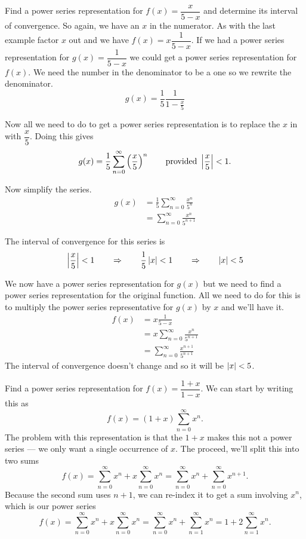 \begin{example}\label{ex_power_five}%
Find a power series representation for $f(x)=\dfrac x{5-x}$ and determine its interval of convergence.
\solution
So again, we have an $x$ in the numerator. As with the last example factor $x$ out and we have $f(x)=x\dfrac1{5-x}$. If we had a power series representation for $g(x)=\dfrac1{5-x}$ we could get a power series representation for $f(x)$. We need the number in the denominator to be a one so we rewrite the denominator.  
\[g(x)=\frac15\frac1{1-\frac x5}\]

Now all we need to do to get a power series representation is to replace the $x$ in  with $\dfrac x5$.  Doing this gives
\[
g(x)=\frac15\sum_{n=0}^\infty\left(\frac x5\right)^n
\qquad\text{provided } \left\lvert \frac x5 \right\rvert<1.
\]

Now simplify the series.
\begin{align*}
	g(x)
	& = \frac15\sum_{n=0}^\infty\frac{x^n}{5^n} \\
	& = \sum_{n=0}^\infty\frac{x^n}{5^{n+1}} 
\end{align*}

The interval of convergence for this series is
\[
\left\lvert \frac x5 \right\rvert<1 \qquad \Rightarrow \qquad \frac15\left\lvert x \right\rvert<1
\qquad \Rightarrow \qquad\left\lvert x \right\rvert<5
\]

We now have a power series representation for $g(x)$ but we need to find a power series representation for the original function.  All we need to do for this is to multiply the power series representative for $g(x)$ by $x$ and we'll have it.  
\begin{align*}
	f(x)
	&= x \frac1{5-x} \\
	&= x \sum_{n=0}^\infty\frac{x^n}{5^{n+1}}\\ 
	& = \sum_{n=0}^\infty\frac{x^{n+1}}{5^{n+1}}
\end{align*}
The interval of convergence doesn't change and so it will be $\left\lvert x \right\rvert<5$.
\end{example}

\begin{example}\label{ex_power_reindex}%
Find a power series representation for $f(x)=\dfrac{1+x}{1-x}$.
\solution
We can start by writing this as
\[f(x)=(1+x)\sum_{n=0}^\infty x^n.\]
The problem with this representation is that the $1+x$ makes this not a power series --- we only want a single occurrence of $x$.  The proceed, we'll split this into two sums
\[
f(x)
=\sum_{n=0}^\infty x^n+x\sum_{n=0}^\infty x^n
=\sum_{n=0}^\infty x^n+\sum_{n=0}^\infty x^{n+1}.
\]
Because the second sum uses $n+1$, we can re-index it to get a sum involving $x^n$, which is our power series
\[
f(x)
=\sum_{n=0}^\infty x^n+x\sum_{n=0}^\infty x^n
=\sum_{n=0}^\infty x^n+\sum_{n=1}^\infty x^n
=1+2\sum_{n=1}^\infty x^n.
\]
\end{example}

